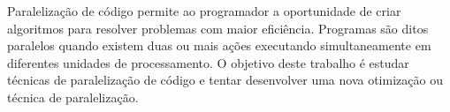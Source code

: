 \begin{resumo}
        Paralelização de código permite ao programador a oportunidade de criar algoritmos para resolver problemas com maior eficiência.
        Programas são ditos paralelos quando existem duas ou mais ações executando simultaneamente em diferentes unidades de processamento.
        O objetivo deste trabalho é estudar técnicas de paralelização de código e tentar desenvolver uma nova otimização ou técnica de paralelização.
\end{resumo}
